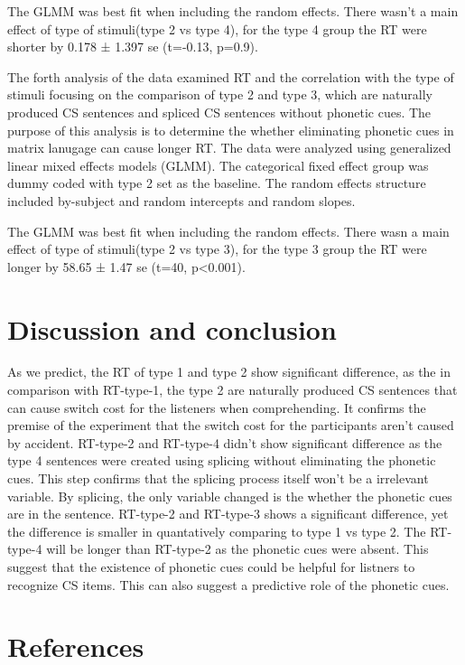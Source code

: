 \documentclass[
  english,
  man,floatsintext]{apa6}
\begin{document}
The GLMM was best fit when including the random effects. There wasn't a main effect of type of stimuli(type 2 vs type 4), for the type 4 group the RT were shorter by 0.178 ± 1.397 se (t=-0.13, p=0.9).

The forth analysis of the data examined RT and the correlation with the type of stimuli focusing on the comparison of type 2 and type 3, which are naturally produced CS sentences and spliced CS sentences without phonetic cues. The purpose of this analysis is to determine the whether eliminating phonetic cues in matrix lanugage can cause longer RT. The data were analyzed using generalized linear mixed effects models (GLMM). The categorical fixed effect group was dummy coded with type 2 set as the baseline. The random effects structure included by-subject and random intercepts and random slopes.

The GLMM was best fit when including the random effects. There wasn a main effect of type of stimuli(type 2 vs type 3), for the type 3 group the RT were longer by 58.65 ± 1.47 se (t=40, p\textless0.001).

\hypertarget{discussion-and-conclusion}{%
\section{Discussion and conclusion}\label{discussion-and-conclusion}}

As we predict, the RT of type 1 and type 2 show significant difference, as the in comparison with RT-type-1, the type 2 are naturally produced CS sentences that can cause switch cost for the listeners when comprehending. It confirms the premise of the experiment that the switch cost for the participants aren't caused by accident.
RT-type-2 and RT-type-4 didn't show significant difference as the type 4 sentences were created using splicing without eliminating the phonetic cues. This step confirms that the splicing process itself won't be a irrelevant variable. By splicing, the only variable changed is the whether the phonetic cues are in the sentence.
RT-type-2 and RT-type-3 shows a significant difference, yet the difference is smaller in quantatively comparing to type 1 vs type 2. The RT-type-4 will be longer than RT-type-2 as the phonetic cues were absent. This suggest that the existence of phonetic cues could be helpful for listners to recognize CS items. This can also suggest a predictive role of the phonetic cues.

\newpage

\hypertarget{references}{%
\section{References}\label{references}}
\end{document}
